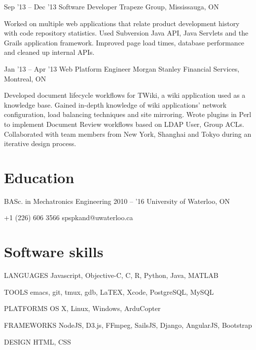 \documentclass{tccv}
\begin{document}
\begin{eventlist}
\item{Sep '13 -- Dec '13}
     {Software Developer}
     {Trapeze Group, Mississauga, ON}

Worked on multiple web applications that relate product development history with code repository statistics. Used Subversion Java API, Java Servlets and the Grails application framework. Improved page load times, database performance and cleaned up internal APIs.

\item{Jan '13 -- Apr '13}
     {Web Platform Engineer}
     {Morgan Stanley Financial Services, Montreal, ON}

Developed document lifecycle workflows for TWiki, a wiki application used as a knowledge base. Gained in-depth knowledge of wiki applications' network configuration, load balancing techniques and site mirroring. Wrote plugins in Perl to implement Document Review workflows based on LDAP User, Group ACLs. Collaborated with team members from New York, Shanghai and Tokyo during an iterative design process.

\end{eventlist}
\section{Education}

\begin{yearlist}

\item[BASc. in Mechatronics Engineering]{2010 -- '16}
  {University of Waterloo, ON}
  {}
\end{yearlist}
    {+1 (226) 606 3566}
    {spspkand@uwaterloo.ca}

\section{Software skills}

\begin{factlist}
\item{LANGUAGES}
      {Javascript, Objective-C, C, R, Python, Java, MATLAB}
 
    \item{TOOLS}
      {emacs, git, tmux, gdb, LaTEX, Xcode, PostgreSQL, MySQL}
      
    \item{PLATFORMS}
      {OS X, Linux, Windows, ArduCopter}
      
    \item{FRAMEWORKS}
      {NodeJS, D3.js, FFmpeg, SailsJS, Django, AngularJS, Bootstrap}
      
    \item{DESIGN}
      {HTML, CSS}
      

\end{factlist}
\end{document}
